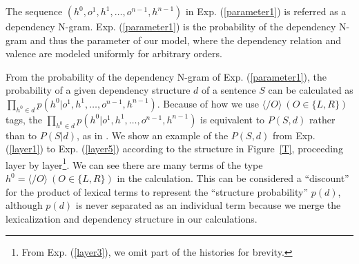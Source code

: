 \documentclass[english]{jnlp_1.4}
\begin{document}
The sequence $(h^0, o^1, h^1, \dots, o^{n-1}, h^{n-1})$ in Exp. (\ref{parameter1}) is referred as a dependency N-gram.
Exp. (\ref{parameter1}) is 
the probability of the dependency N-gram and thus 
the parameter of our model, where the dependency relation and valence are modeled uniformly for arbitrary orders.

From the probability of the dependency N-gram of Exp. (\ref{parameter1}), the probability of a given dependency structure $d$ of a sentence $S$ can be calculated as $\prod_{h^0 \in d}p (h^0 | o^1, h^1, \dots, o^{n-1}, h^{n-1})$. Because of how we use $\langle \slash O \rangle\ (O \in \{L, R\})$ tags, the $\prod_{h^0 \in d}p (h^0 | o^1, h^1, \dots, o^{n-1}, h^{n-1})$ is equivalent to $P(S, d)$ rather than to $P(S|d)$, as in \cite{lee1998automatic}. We show an example of the $P (S, d)$ from Exp. (\ref{layer1}) to Exp. (\ref{layer5}) according to the structure in Figure~\ref{T}, proceeding layer by layer\footnote{From Exp. (\ref{layer3}), we omit part of the histories for brevity.}.
We can see there are many terms of the type $h^0 = \langle \slash O \rangle\ (O \in \{L, R\})$ in the calculation. This can be considered a ``discount'' for the product of lexical terms to represent the ``structure probability'' $p(d)$, although $p(d)$ is never separated as an individual term because we merge the lexicalization and dependency structure in our calculations. 
\end{document}
